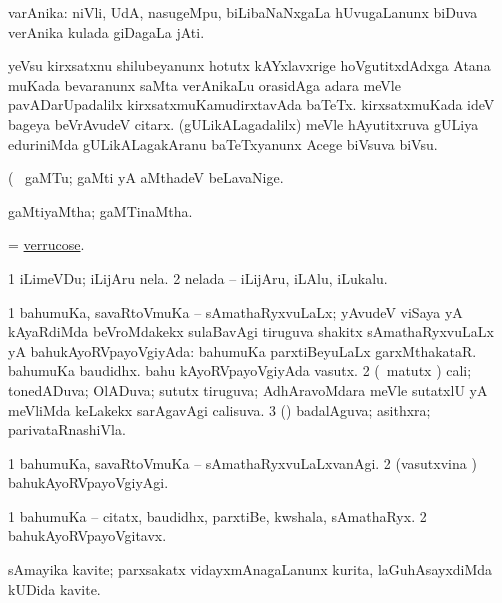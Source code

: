 \bentry
{} 
\gl{\nA}
\expl{}
\bmng
 varAnika: 
\banum
{} niVli, UdA, nasugeMpu, biLibaNaNxgaLa hUvugaLanunx biDuva verAnika kulada giDagaLa jAti. 
\hypertarget{veronica(b)}{} 
 yeVsu kirxsatxnu shilubeyanunx hotutx kAYxlavxrige hoVgutitxdAdxga Atana muKada bevaranunx saMta verAnikaLu orasidAga adara meVle pavADarUpadalilx kirxsatxmuKamudirxtavAda baTeTx. 
 kirxsatxmuKada ideV bageya beVrAvudeV citarx. 
 (gULikALagadalilx) meVle hAyutitxruva gULiya eduriniMda gULikALagakAranu baTeTxyanunx Acege biVsuva biVsu. 
\eanum
\emng
\eentry

\bentry
{} 
\gl{\nA}(\bava\ 
\bmng
 gaMTu; gaMti yA aMthadeV beLavaNige. 
\emng
\eentry

\bentry
{} 
\gl{\gu}
\expl{}
\bmng
 gaMtiyaMtha; gaMTinaMtha. 
\emng
\eentry

\bentry
{} 
\gl{\gu}
\expl{}
\bmng
 = \hyperlink{verrucose}{verrucose}. 
\emng
\eentry

\bentry 
{} 
\gl{\nA}
\expl{}
\bmng
\bnum
\num{1} iLimeVDu; iLijAru nela. 
\num{2} nelada -- iLijAru, iLAlu, iLukalu. 
\enum
\emng
\eentry

\bentry
{} 
\gl{\gu}
\expl{}
\bmng
\bnum
\num{1} bahumuKa, savaRtoVmuKa -- sAmathaRyxvuLaLx; yAvudeV viSaya yA kAyaRdiMda beVroMdakekx sulaBavAgi tiruguva shakitx sAmathaRyxvuLaLx yA bahukAyoRVpayoVgiyAda:  bahumuKa parxtiBeyuLaLx garxMthakataR.  bahumuKa baudidhx.  bahu kAyoRVpayoVgiyAda vasutx. 
\num{2} (\pArxvi\ matutx \savi) cali; tonedADuva; OlADuva; sututx tiruguva; AdhAravoMdara meVle sutatxlU yA meVliMda keLakekx sarAgavAgi calisuva. 
\num{3} (\pArxparx) badalAguva; asithxra; parivataRnashiVla. 
\enum
\emng
\eentry

\bentry 
{} 
\gl{\kirxvi}
\expl{}
\bmng
\bnum
\num{1} bahumuKa, savaRtoVmuKa -- sAmathaRyxvuLaLxvanAgi. 
\num{2} (vasutxvina \vi) bahukAyoRVpayoVgiyAgi. 
\enum
\emng
\eentry

\bentry
{} 
\gl{\nA}
\expl{}
\bmng
\bnum
\num{1} bahumuKa -- citatx, baudidhx, parxtiBe, kwshala, sAmathaRyx. 
\num{2} bahukAyoRVpayoVgitavx. 
\enum
\emng
\eentry

\bentry
{} 
\gl{\nA}
\expl{\F}
\bmng
 sAmayika kavite; parxsakatx vidayxmAnagaLanunx kurita, laGuhAsayxdiMda kUDida kavite. 
\emng
\eentry

